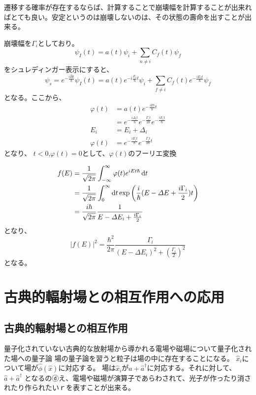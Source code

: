 \documentclass[titlepage]{ltjsarticle}
\begin{document}
遷移する確率が存在するならば、計算することで崩壊幅を計算することが出来ればとても良い。安定というのは崩壊しないのは、その状態の壽命を出すことが出来る。

崩壊幅を\(\Gamma_i\)としており。
\begin{equation}
  \psi_I (t) = a(t) \psi_i + \sum_{n\ne i} C_f(t) \psi_f
\end{equation}
をシュレディンガー表示にすると、
\begin{equation}
  \psi_s = e^{-\frac{i \hat{H}t}{\hbar}}\psi_I(t) = a(t) e^{- i \frac{E_i }{\hbar} t}\psi_i + \sum_{f \ne i} C_f(t)e^{-\frac{iE_f t}{\hbar}}\psi_f  
\end{equation}
となる。ここから、
\begin{align}
  \varphi(t) & = a(t) e^{-\frac{iE t}{\hbar}t} \\
  & = e^{-\frac{i \varDelta_i t }{\hbar}} e^{-\frac{\Gamma_i t}{2 \hbar}}e^{-\frac{iE_i t}{\hbar}}\\
  E_i & = E_i + \varDelta_i \\
  \varphi(t) & = e^{-\frac{iE_i t}{\hbar}} e^{-\frac{\Gamma_i t}{2 \hbar}t}
\end{align}
となり、
\(t<0\),\(\varphi(t)=0\)として、\(\varphi(t)\)のフーリエ変換

\begin{align}
  f(E) & = \frac{1}{\sqrt{2\pi}}\int_{-\infty }^{\infty} \varphi(t) e^{iEt \hbar} \odif{t}\\
  & = \frac{1}{\sqrt{2\pi}}\int^{\infty}_{0}\odif{t} \exp\left( \frac{i }{\hbar}(E-\varDelta{E}+\frac{i \Gamma_{i}}{2})t \right)\\
  & = \frac{i \hbar}{\sqrt{2\pi}}\frac{1}{E-\varDelta {E}_i +\frac{i \Gamma_i}{2}}
\end{align}
となり、
\begin{equation}
  |f(E)|^2 = \frac{\hbar^2}{2\pi} \frac{\Gamma_i}{(E-\varDelta {E}_i)^2 + \left( \frac{\Gamma_i}{2} \right)^2}
\end{equation}
となる。


\section{古典的輻射場との相互作用への応用}
\subsection{古典的輻射場との相互作用}
量子化されていない古典的な放射場から導かれる電場や磁場について量子化された場への量子論
場の量子論を習うと粒子は場の中に存在することになる。
\(\hat{x}_i\)について場が\(\hat{\phi}(\hat{x})\)に対応する。
場は\(\hat{x}_i\)が\(\hat{a} + \hat{a}^\dagger\)に対応する。それに対して、\(\hat{a}+\hat{a}^\dagger\)
となるのⓓえ、電場や磁場が演算子であらわされて、光子が作ったり消されたり作られたいｒを表すことが出来る。
\end{document}
